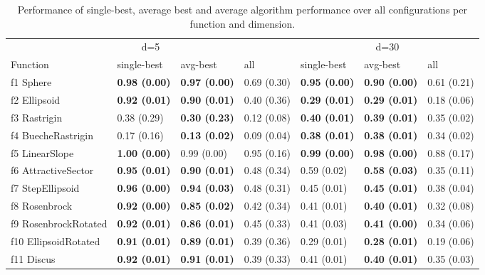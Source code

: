 \begin{table}
\caption{Performance of single-best, average best and average algorithm performance over all configurations per function and dimension.}
\begin{tabular}{lllllll}
\toprule
\multicolumn{4}{c}{d=5} & \multicolumn{3}{c}{d=30} \\
Function & single-best & avg-best & all & single-best & avg-best & all \\
\midrule
f1 Sphere & \textbf{0.98 (0.00)} & \textbf{0.97 (0.00)} & 0.69 (0.30) & \textbf{0.95 (0.00)} & \textbf{0.90 (0.00)} & 0.61 (0.21) \\
f2 Ellipsoid & \textbf{0.92 (0.01)} & \textbf{0.90 (0.01)} & 0.40 (0.36) & \textbf{0.29 (0.01)} & \textbf{0.29 (0.01)} & 0.18 (0.06) \\
f3 Rastrigin & 0.38 (0.29) & \textbf{0.30 (0.23)} & 0.12 (0.08) & \textbf{0.40 (0.01)} & \textbf{0.39 (0.01)} & 0.35 (0.02) \\
f4 BuecheRastrigin & 0.17 (0.16) & \textbf{0.13 (0.02)} & 0.09 (0.04) & \textbf{0.38 (0.01)} & \textbf{0.38 (0.01)} & 0.34 (0.02) \\
f5 LinearSlope & \textbf{1.00 (0.00)} & 0.99 (0.00) & 0.95 (0.16) & \textbf{0.99 (0.00)} & \textbf{0.98 (0.00)} & 0.88 (0.17) \\
f6 AttractiveSector & \textbf{0.95 (0.01)} & \textbf{0.90 (0.01)} & 0.48 (0.34) & 0.59 (0.02) & \textbf{0.58 (0.03)} & 0.35 (0.11) \\
f7 StepEllipsoid & \textbf{0.96 (0.00)} & \textbf{0.94 (0.03)} & 0.48 (0.31) & 0.45 (0.01) & \textbf{0.45 (0.01)} & 0.38 (0.04) \\
f8 Rosenbrock & \textbf{0.92 (0.00)} & \textbf{0.85 (0.02)} & 0.42 (0.34) & 0.41 (0.01) & \textbf{0.40 (0.01)} & 0.32 (0.08) \\
f9 RosenbrockRotated & \textbf{0.92 (0.01)} & \textbf{0.86 (0.01)} & 0.45 (0.33) & 0.41 (0.03) & \textbf{0.41 (0.00)} & 0.34 (0.06) \\
f10 EllipsoidRotated & \textbf{0.91 (0.01)} & \textbf{0.89 (0.01)} & 0.39 (0.36) & 0.29 (0.01) & \textbf{0.28 (0.01)} & 0.19 (0.06) \\
f11 Discus & \textbf{0.92 (0.01)} & \textbf{0.91 (0.01)} & 0.39 (0.33) & 0.41 (0.01) & \textbf{0.40 (0.01)} & 0.35 (0.03) \\

\end{tabular}
\end{table}
